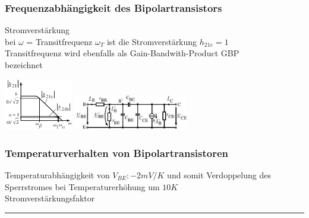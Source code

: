             \subsubsection{Frequenzabh\"angigkeit des Bipolartransistors}
            \begin{minipage}[T]{11cm}
                Stromverst\"arkung
                \hspace{14.5mm}\\
                bei $\omega$ = Transitfrequenz $\omega_T$ ist die Stromverst\"arkung $h_{21e} = 1$\\
                Transitfrequenz wird ebenfalls als Gain-Bandwith-Product GBP\\bezeichnet
            \end{minipage}
            \begin{minipage}[T]{8cm}
                \includegraphics[width=3cm]{./bilder/BipTraFrequenzgang.png}
                \includegraphics[width=5cm]{./bilder/BipTraErsatzschFreq.png}
            \end{minipage}
            
        \subsubsection{Temperaturverhalten von Bipolartransistoren}
            Temperaturabhängigkeit von $V_{BE}: -2mV/K$ und somit Verdoppelung des Sperrstromes bei Temperaturerh\"ohung um $10K$\\
                Stromverst\"arkungsfaktor
                \hspace{4mm}
\vspace{2mm}\hrule

